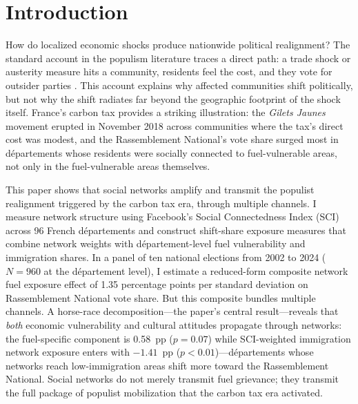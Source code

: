 \documentclass[12pt]{article}
\newcommand{\rn}{Rassemblement National}
\newcommand{\gj}{\textit{Gilets Jaunes}}
\newcommand{\dept}{d\'{e}partement}
\newcommand{\depts}{d\'{e}partements}
\begin{document}

\section{Introduction}
\label{sec:intro}

How do localized economic shocks produce nationwide political realignment? The standard account in the populism literature traces a direct path: a trade shock or austerity measure hits a community, residents feel the cost, and they vote for outsider parties \citep{autor2013china, colantone2018trade, fetzer2019did}. This account explains why affected communities shift politically, but not why the shift radiates far beyond the geographic footprint of the shock itself. France's carbon tax provides a striking illustration: the \gj{} movement erupted in November 2018 across communities where the tax's direct cost was modest, and the \rn{}'s vote share surged most in \depts{} whose residents were socially connected to fuel-vulnerable areas, not only in the fuel-vulnerable areas themselves.

This paper shows that social networks amplify and transmit the populist realignment triggered by the carbon tax era, through multiple channels. I measure network structure using Facebook's Social Connectedness Index (SCI) across 96 French \depts{} and construct shift-share exposure measures that combine network weights with \dept{}-level fuel vulnerability and immigration shares. In a panel of ten national elections from 2002 to 2024 ($N = 960$ at the \dept{} level), I estimate a reduced-form composite network fuel exposure effect of 1.35 percentage points per standard deviation on \rn{} vote share. But this composite bundles multiple channels. A horse-race decomposition---the paper's central result---reveals that \emph{both} economic vulnerability and cultural attitudes propagate through networks: the fuel-specific component is 0.58~pp ($p = 0.07$) while SCI-weighted immigration network exposure enters with $-1.41$~pp ($p < 0.01$)---\depts{} whose networks reach low-immigration areas shift more toward the \rn{}. Social networks do not merely transmit fuel grievance; they transmit the full package of populist mobilization that the carbon tax era activated.
\end{document}
